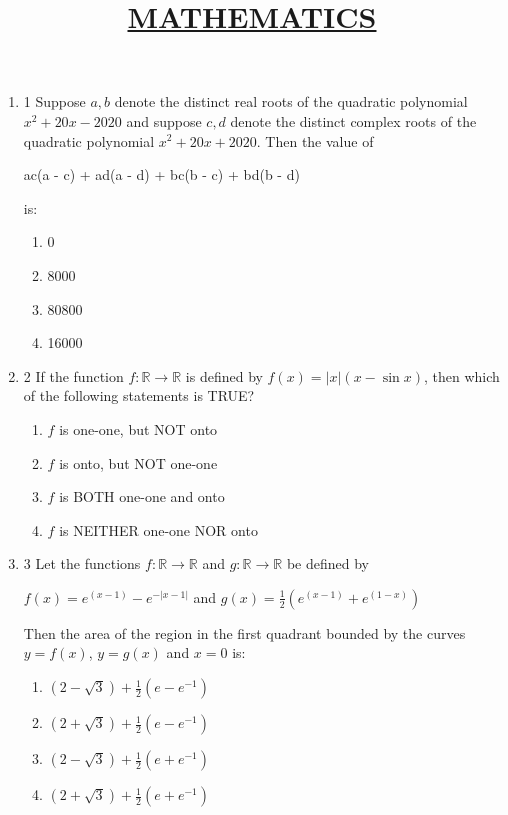\documentclass{article}
\title{\underline{\textbf{MATHEMATICS}}}
\date{}
\begin{document}
\maketitle
\begin{enumerate}
    
\item 1 Suppose $a, b$ denote the distinct real roots of the quadratic polynomial $x^2+20x-2020$ and suppose $c, d$ denote the distinct complex roots of the quadratic polynomial $x^2+20x+2020$. Then the value of

\begin{center}
     ac(a - c) + ad(a - d) + bc(b - c) + bd(b - d)
\end{center}

    is:
    
    \begin{enumerate}
        \item  0
        \item  8000
        \item  80800
        \item  16000
    \end{enumerate}

\item 2  If the function $f: \mathbb{R} \to \mathbb{R}$ is defined by $f(x)=|x|(x-\sin x)$, then which of the following statements is TRUE?

    \begin{enumerate}
        \item  $f$ is one-one, but NOT onto
        \item  $f$ is onto, but NOT one-one
        \item  $f$ is BOTH one-one and onto
        \item  $f$ is NEITHER one-one NOR onto
    \end{enumerate}

\item 3  Let the functions $f: \mathbb{R} \to \mathbb{R}$ and $g: \mathbb{R} \to \mathbb{R}$ be defined by 

$f(x) = e^{(x - 1)} - e^{- |x - 1|}$ and $ g(x) = \frac{1}{2} \left(e^{(x - 1)} + e^{(1 - x)}\right)$

    Then the area of the region in the first quadrant bounded by the curves $y = f(x)$, $y = g(x)$ and $x = 0$ is:

    \begin{enumerate}
        \item  $(2 - \sqrt{3}) + \frac{1}{2} (e - e^{-1})$
        \item  $(2 + \sqrt{3}) + \frac{1}{2} (e - e^{-1})$
        \item  $(2 - \sqrt{3}) + \frac{1}{2} (e + e^{-1})$
        \item  $(2 + \sqrt{3}) + \frac{1}{2} (e + e^{-1})$
    \end{enumerate}


\end{enumerate}
\end{document}
